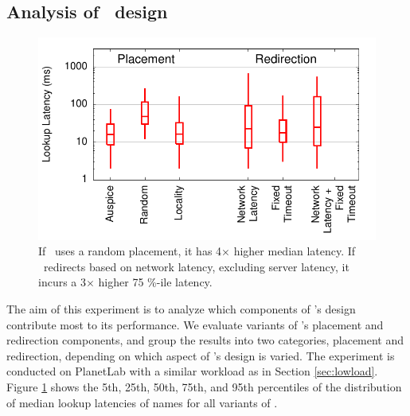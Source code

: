 \subsection{Analysis of \auspice\ design}
\label{sec:microbenchmark}

\begin{figure}[ht]
\centering
\includegraphics[scale=0.55]{graph/system-exp/mb-stats.pdf}
\vspace{-0.1in}
\caption{If \auspice\ uses a random placement, it has 4$\times$ higher median latency. If \auspice\ redirects  based on network latency, excluding server latency, it incurs a  3$\times$ higher 75 \%-ile latency.}
\vspace{-0.1in}
\label{fig:micro}
\end{figure}


The aim of this experiment is to analyze which components of \auspice's design contribute most to its  performance.
We evaluate variants of \auspice's placement and redirection components, and group the results into two categories, placement and redirection, depending on which aspect of \auspice's design is varied. The experiment is conducted on PlanetLab with a similar workload as in Section \ref{sec:lowload}.
Figure \ref{fig:micro} shows the 5th, 25th, 50th, 75th, and 95th percentiles of the distribution of median lookup latencies of names for all variants of \auspice.


